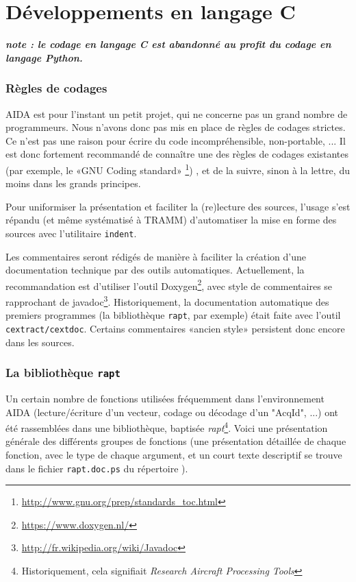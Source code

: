 \part{Développements en langage C}
\label{part:dev_C}

\textbf{\textit{note : le codage en langage C est abandonné au profit du codage
en langage Python.}}

\section{Règles de codages}
   AIDA est pour l'instant un petit projet, qui ne concerne pas un
grand nombre de programmeurs. Nous n'avons donc pas mis en place
de règles de codages strictes. Ce n'est pas une raison pour écrire
du code incompréhensible, non-portable, ... Il est donc fortement
recommandé de connaître une des règles de codages existantes
(par exemple, le «GNU Coding standard» 
\footnote{\url{http://www.gnu.org/prep/standards_toc.html}})
, et de la suivre, sinon \`a la lettre, du 
moins dans les grands principes.

  Pour uniformiser la présentation et faciliter la (re)lecture
des sources, l'usage s'est répandu (et même systématisé à TRAMM)
d'automatiser la mise en forme des sources avec l'utilitaire \texttt{indent}.

  Les commentaires seront rédigés de manière à faciliter la
création d'une documentation technique par des outils automatiques.
Actuellement, la recommandation est d'utiliser l'outil
Doxygen\footnote{\url{https://www.doxygen.nl/}},
avec style de commentaires se
rapprochant de javadoc\footnote{\url{http://fr.wikipedia.org/wiki/Javadoc}}.
Historiquement, la documentation automatique des premiers programmes (la 
bibliothèque \texttt{rapt}, par exemple) était faite avec l'outil
\texttt{cextract/cextdoc}.
Certains commentaires «ancien style» persistent donc encore
dans les sources.


\section{La bibliothèque \texttt{rapt}}
\label{sec:rapt}
   Un certain nombre de fonctions utilisées fréquemment dans
l'environnement AIDA (lecture/écriture d'un vecteur, codage
ou décodage d'un "AcqId", ...) ont été rassemblées dans une 
bibliothèque, baptisée \textit{rapt}\footnote{Historiquement,
cela signifiait \textit{Research Aircraft Processing Tools}}.
Voici une présentation générale des différents groupes de fonctions
(une présentation détaillée de chaque fonction, avec le type
de chaque argument, et un court texte descriptif se trouve
dans le fichier \texttt{rapt.doc.ps} du répertoire 
).

